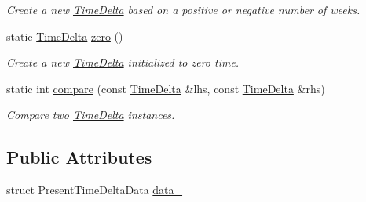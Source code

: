 \begin{DoxyCompactItemize}
\begin{DoxyCompactList}\small\item\em Create a new \hyperlink{structTimeDelta}{Time\-Delta} based on a positive or negative number of weeks. \end{DoxyCompactList}\item 
static \hyperlink{structTimeDelta}{Time\-Delta} \hyperlink{structTimeDelta_a2dec837a107c5e46e14b9c69557209fa}{zero} ()
\begin{DoxyCompactList}\small\item\em Create a new \hyperlink{structTimeDelta}{Time\-Delta} initialized to zero time. \end{DoxyCompactList}\item 
static int \hyperlink{structTimeDelta_a1bee789870de5a374ee472ffa4bff172}{compare} (const \hyperlink{structTimeDelta}{Time\-Delta} \&lhs, const \hyperlink{structTimeDelta}{Time\-Delta} \&rhs)
\begin{DoxyCompactList}\small\item\em Compare two \hyperlink{structTimeDelta}{Time\-Delta} instances. \end{DoxyCompactList}\end{DoxyCompactItemize}
\subsection*{Public Attributes}
\begin{DoxyCompactItemize}
\item 
struct Present\-Time\-Delta\-Data \hyperlink{structTimeDelta_ab88989772d6ab486e1e008238d96eb81}{data\-\_\-}
\end{DoxyCompactItemize}
